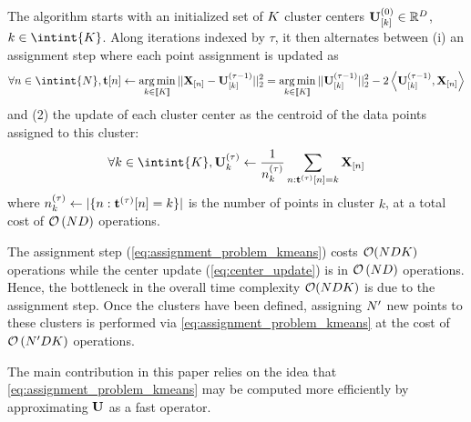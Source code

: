 The algorithm starts with an initialized set of $K$ cluster centers ${\mathbf{U}}_{[k]}^{(0)} \in \mathbb{R}^D$, $k\in\intint{\nclusters}$. Along iterations indexed by $\tau$, it then alternates between (i) an assignment step where each point assignment is updated as
\begin{align}
\label{eq:assignment_problem_kmeans}
\forall n\in\intint{N}, \rvt[n] \leftarrow \argmin_{k \in [\![\nclusters]\!]} ||\rmX_{[n]} - \rmU_{[k]}^{(\tau-1)}||_2^2 = \argmin_{k \in [\![\nclusters]\!]} ||\rmU_{[k]}^{(\tau-1)}||_2^2 - 2 \left <\rmU_{[k]}^{(\tau-1)}, \rmX_{[n]}\right >
\end{align}
and (2) the update of each cluster center as the centroid of the data points assigned to this cluster:
\begin{align}
\label{eq:center_update}
\forall k\in\intint{K}, \rmU^{(\tau)}_k \leftarrow \frac{1}{n_k^{(\tau)}} \sum_{n: \rvt^{(\tau)}[n]= k} {\rmX_{[n]}}
\end{align}
where $n_k^{(\tau)} \leftarrow |\{n: {\mathbf{t}}^{(\tau)}[n]=k\}|$ is the number of points in cluster $k$, at a total cost of $\mathcal{O}\left (ND\right )$ operations.

The assignment step (\eqref{eq:assignment_problem_kmeans}) costs $\mathcal{O}(NDK)$ operations while the center update (\eqref{eq:center_update}) is in $\mathcal{O}\left (ND\right )$ operations. Hence, the bottleneck in the overall time complexity $\mathcal{O}(NDK)$ is due to the assignment step. Once the clusters have been defined, assigning $N'$ new points to these clusters is performed via \eqref{eq:assignment_problem_kmeans} at the cost of $\mathcal{O}\left (N'DK \right )$ operations.

The main contribution in this paper relies on the idea that \eqref{eq:assignment_problem_kmeans} may be computed more efficiently by approximating ${\mathbf{U}}$ as a fast operator.

%

